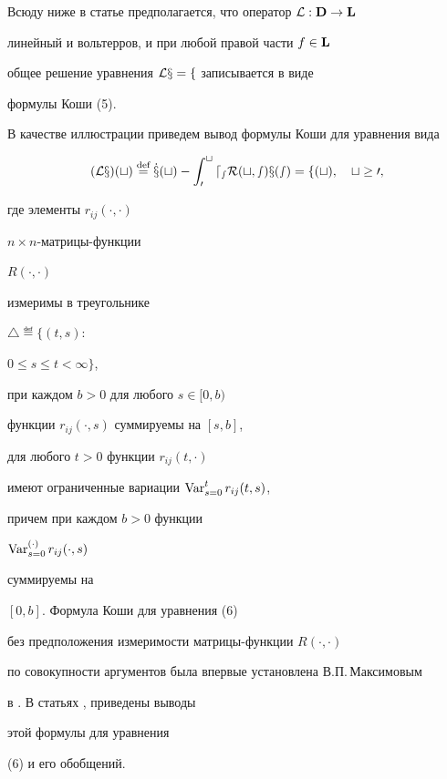 Всюду ниже в статье предполагается, что оператор $\cal L:\bold D\to\bold L$


линейный и вольтерров, и при любой правой части $f\in\bold L$


общее решение уравнения $\cal Lx=f$ записывается в виде


формулы Коши (5).





В качестве иллюстрации приведем вывод формулы Коши для уравнения вида


\begin{equation}


(\cal L x)(t)\eqdef \Dot x (t) - \int_0^t d_sR(t,s) x(s) = f(t),


\quad t\ge 0,


\end{equation}


где элементы $r_{ij}(\cdot,\cdot)$


$n\times n$-матрицы-функции


$R(\cdot,\cdot)$


измеримы в треугольнике


$\bigtriangleup \eqdef \{(t,s):$\linebreak




$0\le s\le t <\infty\}$,


при каждом $b > 0$ для любого $s\in [0,b)$


функции $r_{ij}(\cdot, s)$ суммируемы на $[s,b]$,


для любого $t > 0$ функции $r_{ij}(t,\cdot)$


имеют ограниченные вариации $\Var_{s=0}^tr_{ij}(t, s)$,


причем при каждом $b > 0$ функции


$\Var_{s=0}^{(\cdot)} r_{ij}(\cdot, s)$


суммируемы на


$[0,b].$ Формула Коши для уравнения (6)


без предположения измеримости матрицы-функции $R(\cdot,\cdot)$


по совокупности аргументов была впервые установлена В.П.\,Максимовым


в \cite{Mak1}. В статьях \cite{Mak2}, \cite{Mak3} приведены выводы


этой формулы для уравнения


(6) и его обобщений.





